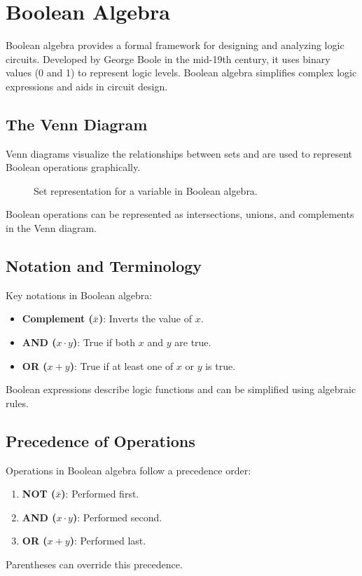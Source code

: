 \documentclass[twocolumn]{article}
\begin{document}
\section{Boolean Algebra}
Boolean algebra provides a formal framework for designing and analyzing logic circuits. Developed by George Boole in the mid-19th century, it uses binary values (0 and 1) to represent logic levels. Boolean algebra simplifies complex logic expressions and aids in circuit design.

\subsection{The Venn Diagram}
Venn diagrams visualize the relationships between sets and are used to represent Boolean operations graphically.
\begin{figure}[h]
    \centering
    \caption{Set representation for a variable in Boolean algebra.}
\end{figure}

Boolean operations can be represented as intersections, unions, and complements in the Venn diagram.

\subsection{Notation and Terminology}
Key notations in Boolean algebra:
\begin{itemize}
    \item \textbf{Complement ($\bar{x}$)}: Inverts the value of $x$.
    \item \textbf{AND ($x \cdot y$)}: True if both $x$ and $y$ are true.
    \item \textbf{OR ($x + y$)}: True if at least one of $x$ or $y$ is true.
\end{itemize}
Boolean expressions describe logic functions and can be simplified using algebraic rules.

\subsection{Precedence of Operations}
Operations in Boolean algebra follow a precedence order:
\begin{enumerate}
    \item \textbf{NOT ($\bar{x}$)}: Performed first.
    \item \textbf{AND ($x \cdot y$)}: Performed second.
    \item \textbf{OR ($x + y$)}: Performed last.
\end{enumerate}
Parentheses can override this precedence.
\end{document}
